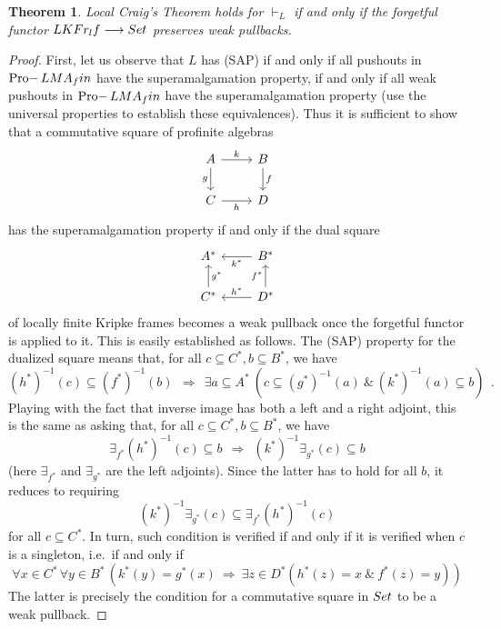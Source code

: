 \documentclass[10pt,a4paper]{amsart}
\newtheorem{thm}{Theorem}
\theoremstyle{definition}
\DeclareMathOperator{\Pro}{Pro-}
\newcommand{\KFr}{\textup{\textbf{KFr}}}
\newcommand{\MA}{\textup{\textbf{MA}}}
\newcommand{\fin}{\textit{fin}}
\newcommand{\lf}{\textit{lf}}
\newcommand{\Set}{\textup{\textbf{Set}}}
\begin{document}
\setcounter{section}{5}
\setcounter{equation}{0}
\setcounter{cor}{2}
\setcounter{defn}{8}
\setcounter{example}{2}
\setcounter{lem}{3}
\setcounter{prop}{11}
\setcounter{rem}{8}
\setcounter{thm}{11}
\begin{thm}\label{thm:craig}
Local Craig's Theorem holds for $\vdash_L$ if and only if the forgetful functor $L\KFr_\lf \longrightarrow \Set$ preserves weak pullbacks.
\end{thm}

\setcounter{section}{5}
\setcounter{equation}{0}
\setcounter{cor}{2}
\setcounter{defn}{8}
\setcounter{example}{2}
\setcounter{lem}{3}
\setcounter{prop}{11}
\setcounter{rem}{8}
\setcounter{thm}{12}
\begin{proof}
First, let us observe that $L$ has (SAP) if and only if all pushouts in $\Pro L\MA_\fin$ have the superamalgamation property, if and only if all weak pushouts in $\Pro L\MA_\fin$ have the superamalgamation property (use the universal properties to establish these equivalences). Thus it is sufficient to show that a commutative square of profinite algebras 
    \[\begin{tikzcd}
	A & B \\
	C & D
	\arrow["k", from=1-1, to=1-2]
	\arrow["g"', from=1-1, to=2-1]
	\arrow["f", from=1-2, to=2-2]
	\arrow["h"', from=2-1, to=2-2]
    \end{tikzcd}\]
    has the superamalgamation property if and only if the dual square 
    \[\begin{tikzcd}
	A^* & B^* \\
	C^* & D^*
	\arrow["k^*", from=1-2, to=1-1]
	\arrow["g^*"', from=2-1, to=1-1]
	\arrow["f^*", from=2-2, to=1-2]
	\arrow["h^*"', from=2-2, to=2-1]
    \end{tikzcd}\]
     of locally finite Kripke frames becomes a weak pullback once the forgetful functor is applied to it.
     This is easily established as follows. The (SAP) property for the dualized square means that, for all $c\subseteq C^*, b\subseteq B^*$, we have
     $$
     (h^*)^{-1}(c) \subseteq (f^*)^{-1}(b)~~\Rightarrow~~
     \exists a\subseteq A^*~(c\subseteq  (g^*)^{-1}(a)~\&~
      (k^*)^{-1}(a)\subseteq b)~~.
     $$
     Playing with the fact that inverse image has both a left and a right adjoint, this is the same as asking that, for all $c\subseteq C^*, b\subseteq B^*$, we have 
     $$
     \exists_{f^*}(h^*)^{-1}(c)\subseteq b 
     ~~\Rightarrow~~(k^*)^{-1}\exists_{g^*}(c)\subseteq b 
     $$
     (here $\exists_{f^*}$ and $\exists_{g^*}$ are the left adjoints). Since the latter has to hold for all $b$, it reduces to requiring 
     $$
     (k^*)^{-1}\exists_{g^*}(c) \subseteq  \exists_{f^*}(h^*)^{-1}(c)
     $$
     for all $c\subseteq C^*$. In turn, such condition is verified if and only if it is verified when $c$ is a singleton, i.e.\ if and only if
     $$
     \forall x\in C^*\, \forall y\in B^*\,(k^*(y)=g^*(x) 
     ~\Rightarrow~\exists z\in D^* (h^*(z)=x ~\&~f^*(z)=y))
     $$
     The latter  is precisely the condition for a commutative square in $\Set$ to be a weak pullback.
\end{proof}
\end{document}
